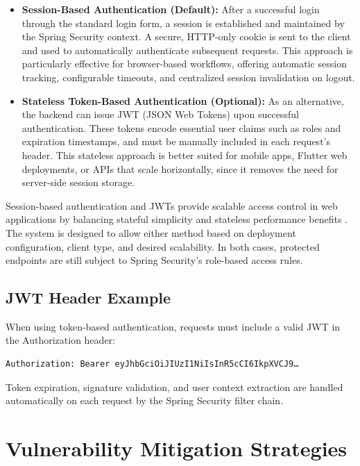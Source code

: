 \documentclass[12pt,a4paper]{report} %
\begin{document}
\begin{itemize}
    \item \textbf{Session-Based Authentication (Default):}
    After a successful login through the standard login form, a session is established and maintained by the Spring Security context. A secure, HTTP-only cookie is sent to the client and used to automatically authenticate subsequent requests. This approach is particularly effective for browser-based workflows, offering automatic session tracking, configurable timeouts, and centralized session invalidation on logout.
    
    \item \textbf{Stateless Token-Based Authentication (Optional):}  
    As an alternative, the backend can issue JWT (JSON Web Tokens) upon successful authentication. These tokens encode essential user claims such as roles and expiration timestamps, and must be manually included in each request's header. This stateless approach is better suited for mobile apps, Flutter web deployments, or APIs that scale horizontally, since it removes the need for server-side session storage.
\end{itemize}

Session-based authentication and JWTs provide scalable access control in web applications by balancing stateful simplicity and stateless performance benefits \cite{jain2023jwt}. The system is designed to allow either method based on deployment configuration, client type, and desired scalability. In both cases, protected endpoints are still subject to Spring Security's role-based access rules.

\subsection*{JWT Header Example}

When using token-based authentication, requests must include a valid JWT in the Authorization header:

\begin{verbatim}
Authorization: Bearer eyJhbGciOiJIUzI1NiIsInR5cCI6IkpXVCJ9…
\end{verbatim}

Token expiration, signature validation, and user context extraction are handled automatically on each request by the Spring Security filter chain.

\section{Vulnerability Mitigation Strategies}
\end{document}

